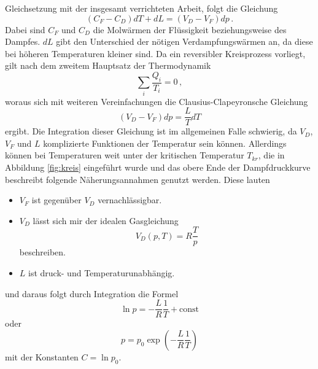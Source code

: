 Gleichsetzung mit der insgesamt verrichteten Arbeit, folgt die Gleichung 
\begin{equation}
    (C_F-C_D) dT + dL = (V_D-V_F)dp \, .
\end{equation}
Dabei sind $C_F$ und $C_D$ die Molwärmen der Flüssigkeit beziehungsweise des Dampfes. 
$dL$ gibt den Unterschied der nötigen Verdampfungswärmen an, da diese bei höheren Temperaturen kleiner sind. Da ein reversibler Kreisprozess vorliegt, gilt nach dem zweitem Hauptsatz
der Thermodynamik 
\begin{equation}
    \sum_i \frac{Q_i}{T_i} = 0 \, ,
\end{equation}
woraus sich mit weiteren Vereinfachungen die Clausius-Clapeyronsche Gleichung
\begin{equation}
    (V_D-V_F)dp = \frac{L}{T}dT
    \label{eqn:claus}
\end{equation}
ergibt. Die Integration dieser Gleichung ist im allgemeinen Falle schwierig, da $V_D$, $V_F$ und $L$ komplizierte Funktionen der Temperatur sein können.
Allerdings können bei Temperaturen weit unter der kritischen Temperatur $T_{kr}$, die in Abbildung \ref{fig:kreis} eingeführt wurde und das obere Ende der Dampfdruckkurve beschreibt
folgende Näherungsannahmen genutzt werden. Diese lauten
\begin{itemize}
    \item $V_F$ ist gegenüber $V_D$ vernachlässigbar.
    \item $V_D$ lässt sich mir der idealen Gasgleichung
        \begin{equation}
            V_D(p,T) =R \frac{T}{p}
            \label{eqn:ideal}
        \end{equation}
        beschreiben.
    \item $L$ ist druck- und Temperaturunabhängig.
\end{itemize}
und daraus folgt durch Integration die Formel
\begin{equation}
    \ln p = - \frac{L}{R} \frac{1}{T} + \text{const}
    \label{eqn:log}
\end{equation}
oder
\begin{equation}
    p= p_0 \exp \left(- \frac{L}{R} \frac{1}{T}\right)
\end{equation}
mit der Konstanten $C= \ln p_0$.